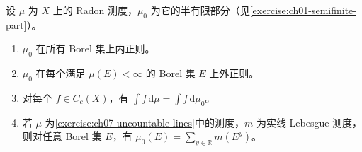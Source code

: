 \documentclass[../../main.tex]{subfiles}
\begin{document}
\begin{exercise}\label{exercise:ch07-semifinite-radon}
设 $\mu$ 为 $X$ 上的 Radon 测度，$\mu_0$ 为它的半有限部分（见\cref{exercise:ch01-semifinite-part}）。
\begin{enumerate}[label=\alph*.,ref=(\alph*)]
\item\label{item:ch07-semifinite-inner} $\mu_0$ 在所有 Borel 集上内正则。
\item\label{item:ch07-semifinite-finite-outer} $\mu_0$ 在每个满足 $\mu(E)<\infty$ 的 Borel 集 $E$ 上外正则。
\item\label{item:ch07-semifinite-cc-integral} 对每个 $f\in C_c(X)$，有 $\int f\,\mathrm d\mu=\int f\,\mathrm d\mu_0$。
\item\label{item:ch07-semifinite-lines-formula} 若 $\mu$ 为\cref{exercise:ch07-uncountable-lines}中的测度，$m$ 为实线 Lebesgue 测度，则对任意 Borel 集 $E$，有 $\mu_0(E)=\sum_{y\in\mathbb R}m(E^y)$。
\end{enumerate}
\end{exercise}
\end{document}

